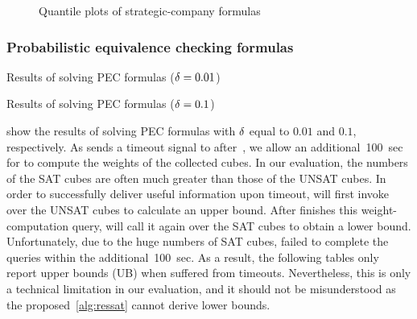\begin{figure}[hp]
{        \label{fig:ressat-quantile-memory-strategic}
    }
    \caption{Quantile plots of strategic-company formulas}
    \label{fig:ressat-quantile-strategic}
\end{figure}

\subsubsection{Probabilistic equivalence checking formulas}

\begin{table}[ht]
    \centering
    \scriptsize
    \caption{Results of solving PEC formulas ($\delta=0.01$)}
    \label{tbl:random-exist-ssat-pec-0.01}
\end{table}

\begin{table}[ht]
    \centering
    \scriptsize
    \caption{Results of solving PEC formulas ($\delta=0.1$)}
    \label{tbl:random-exist-ssat-pec-0.10}
\end{table}

show the results of solving PEC formulas with $\delta$ equal to $0.01$ and $0.1$, respectively.
As \benchexec sends a timeout signal to \ressat after~\timelimit,
we allow an additional~\SI{100}{sec} for \ressat to compute the weights of the collected cubes.
In our evaluation, the numbers of the SAT cubes are often much greater than those of the UNSAT cubes.
In order to successfully deliver useful information upon timeout,
\ressat will first invoke \cachet over the UNSAT cubes to calculate an upper bound.
After \cachet finishes this weight-computation query,
\ressat will call it again over the SAT cubes to obtain a lower bound.
Unfortunately, due to the huge numbers of SAT cubes,
\cachet failed to complete the queries within the additional~\SI{100}{sec}.
As a result, the following tables only report upper bounds (UB) when \ressat suffered from timeouts.
Nevertheless, this is only a technical limitation in our evaluation,
and it should not be misunderstood as the proposed~\cref{alg:ressat} cannot derive lower bounds.

